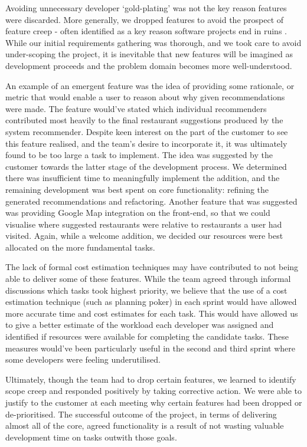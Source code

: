\documentclass{l3proj}
\begin{document}
Avoiding unnecessary developer `gold-plating' was not the key reason features were discarded. More generally, we dropped features to avoid the prospect of feature creep - often identified as a key reason software projects end in ruins \cite{ProjectFailure}. While our initial requirements gathering was thorough, and we took care to avoid under-scoping the project, it is inevitable that new features will be imagined as development proceeds and the problem domain becomes more well-understood. 

An example of an emergent feature was the idea of providing some rationale, or metric that would enable a user to reason about why given recommendations were made. The feature would've stated which individual recommenders contributed most heavily to the final restaurant suggestions produced by the system recommender. Despite keen interest on the part of the customer to see this feature realised, and the team's desire to incorporate it, it was ultimately found to be too large a task to implement. The idea was suggested by the customer towards the latter stage of the development process. We determined there was insufficient time to meaningfully implement the addition, and the remaining development was best spent on core functionality: refining the generated recommendations and refactoring. Another feature that was suggested was providing Google Map integration on the front-end, so that we could visualise where suggested restaurants were relative to restaurants a user had visited. Again, while a welcome addition, we decided our resources were best allocated on the more fundamental tasks.

The lack of formal cost estimation techniques may have contributed to not being able to deliver some of these features. While the team agreed through informal discussions which tasks took highest priority, we believe that the use of a cost estimation technique (such as planning poker) in each sprint would have allowed more accurate time and cost estimates for each task. This would have allowed us to give a better estimate of the workload each developer was assigned and identified if resources were available for completing the candidate tasks. These measures would've been particularly useful in the second and third sprint where some developers were feeling underutilised. 

Ultimately, though the team had to drop certain features, we learned to identify scope creep and responded positively by taking corrective action. We were able to justify to the customer at each meeting why certain features had been dropped or de-prioritised. The successful outcome of the project, in terms of delivering almost all of the core, agreed functionality is a result of not wasting valuable development time on tasks outwith those goals. 
\end{document}
